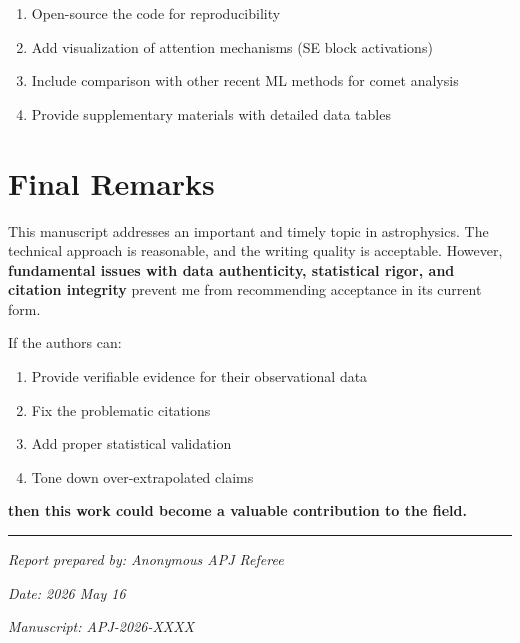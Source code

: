 \documentclass[12pt,a4paper]{article}
\newcommand{\critical}[1]{\textcolor{CriticalRed}{\textbf{#1}}}
\newcommand{\good}[1]{\textcolor{GoodGreen}{\textbf{#1}}}
\begin{document}
\begin{enumerate}[label=\textbf{O\arabic*:}]
    \item Open-source the code for reproducibility
    \item Add visualization of attention mechanisms (SE block activations)
    \item Include comparison with other recent ML methods for comet analysis
    \item Provide supplementary materials with detailed data tables
\end{enumerate}

\section{Final Remarks}

This manuscript addresses an important and timely topic in astrophysics. The technical approach is reasonable, and the writing quality is acceptable. However, \critical{fundamental issues with data authenticity, statistical rigor, and citation integrity} prevent me from recommending acceptance in its current form.

If the authors can:
\begin{enumerate}
    \item Provide verifiable evidence for their observational data
    \item Fix the problematic citations
    \item Add proper statistical validation
    \item Tone down over-extrapolated claims
\end{enumerate}

\good{then this work could become a valuable contribution to the field.}

\vspace{1cm}

\noindent\rule{\textwidth}{0.5pt}

\vspace{0.5cm}

{\small\textit{Report prepared by: Anonymous APJ Referee}}

{\small\textit{Date: 2026 May 16}}

{\small\textit{Manuscript: APJ-2026-XXXX}}
\end{document}
